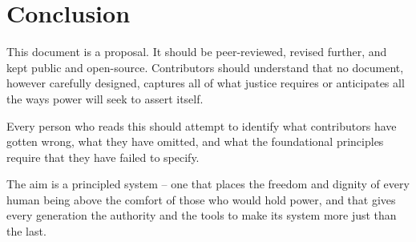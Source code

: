 %

\clearpage
\section*{Conclusion}

This document is a proposal. It should be peer-reviewed, revised further, and kept public and open-source. Contributors should understand that no document, however carefully designed, captures all of what justice requires or anticipates all the ways power will seek to assert itself.

Every person who reads this should attempt to identify what contributors have gotten wrong, what they have omitted, and what the foundational principles require that they have failed to specify.

The aim is a principled system -- one that places the freedom and dignity of every human being above the comfort of those who would hold power, and that gives every generation the authority and the tools to make its system more just than the last.